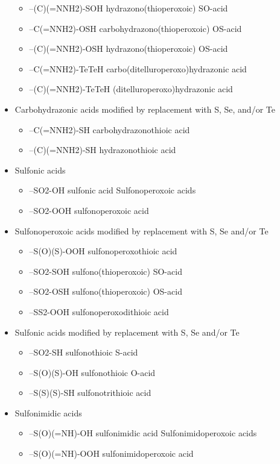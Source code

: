 \documentclass[a4paper,12pt]{report}
\begin{document}
\begin{itemize}
\begin{itemize}
\item –(C)(=NNH2)-SOH hydrazono(thioperoxoic) SO-acid 
\item –C(=NNH2)-OSH carbohydrazono(thioperoxoic) OS-acid 
\item –(C)(=NNH2)-OSH hydrazono(thioperoxoic) OS-acid 
\item –C(=NNH2)-TeTeH carbo(ditelluroperoxo)hydrazonic acid 
\item –(C)(=NNH2)-TeTeH (ditelluroperoxo)hydrazonic acid 
\end{itemize}
\item Carbohydrazonic acids modified by replacement with S, Se, and/or Te 
\begin{itemize}
\item –C(=NNH2)-SH carbohydrazonothioic acid 
\item –(C)(=NNH2)-SH hydrazonothioic acid 
\end{itemize}
\item Sulfonic acids 
\begin{itemize}
\item –SO2-OH sulfonic acid Sulfonoperoxoic acids 
\item –SO2-OOH sulfonoperoxoic acid 
\end{itemize}
\item Sulfonoperoxoic acids modified by replacement with S, Se and/or Te 
\begin{itemize}
\item –S(O)(S)-OOH sulfonoperoxothioic acid 
\item –SO2-SOH sulfono(thioperoxoic) SO-acid 
\item –SO2-OSH sulfono(thioperoxoic) OS-acid 
\item –SS2-OOH sulfonoperoxodithioic acid 
\end{itemize}
\item Sulfonic acids modified by replacement with S, Se and/or Te 
\begin{itemize}
\item –SO2-SH sulfonothioic S-acid 
\item –S(O)(S)-OH sulfonothioic O-acid 
\item –S(S)(S)-SH sulfonotrithioic acid 
\end{itemize}
\item Sulfonimidic acids 
\begin{itemize}
\item –S(O)(=NH)-OH sulfonimidic acid Sulfonimidoperoxoic acids 
\item –S(O)(=NH)-OOH sulfonimidoperoxoic acid 

\end{itemize}
\end{itemize}
\end{document}
